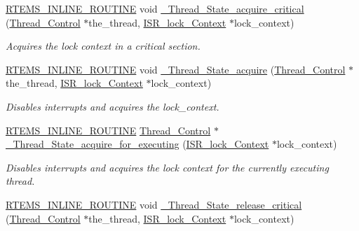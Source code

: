 \begin{DoxyCompactItemize}
\mbox{\hyperlink{group__RTEMSScoreBaseDefs_gac216239df231d5dbd15e3520b0b9313f}{R\+T\+E\+M\+S\+\_\+\+I\+N\+L\+I\+N\+E\+\_\+\+R\+O\+U\+T\+I\+NE}} void \mbox{\hyperlink{group__RTEMSScoreThread_gafd7ff215edf64b4611da7b7c1d4e3050}{\+\_\+\+Thread\+\_\+\+State\+\_\+acquire\+\_\+critical}} (\mbox{\hyperlink{struct__Thread__Control}{Thread\+\_\+\+Control}} $\ast$the\+\_\+thread, \mbox{\hyperlink{structISR__lock__Context}{I\+S\+R\+\_\+lock\+\_\+\+Context}} $\ast$lock\+\_\+context)
\begin{DoxyCompactList}\small\item\em Acquires the lock context in a critical section. \end{DoxyCompactList}\item 
\mbox{\hyperlink{group__RTEMSScoreBaseDefs_gac216239df231d5dbd15e3520b0b9313f}{R\+T\+E\+M\+S\+\_\+\+I\+N\+L\+I\+N\+E\+\_\+\+R\+O\+U\+T\+I\+NE}} void \mbox{\hyperlink{group__RTEMSScoreThread_ga9a583864cdcbb7eaeda8002d05de6912}{\+\_\+\+Thread\+\_\+\+State\+\_\+acquire}} (\mbox{\hyperlink{struct__Thread__Control}{Thread\+\_\+\+Control}} $\ast$the\+\_\+thread, \mbox{\hyperlink{structISR__lock__Context}{I\+S\+R\+\_\+lock\+\_\+\+Context}} $\ast$lock\+\_\+context)
\begin{DoxyCompactList}\small\item\em Disables interrupts and acquires the lock\+\_\+context. \end{DoxyCompactList}\item 
\mbox{\hyperlink{group__RTEMSScoreBaseDefs_gac216239df231d5dbd15e3520b0b9313f}{R\+T\+E\+M\+S\+\_\+\+I\+N\+L\+I\+N\+E\+\_\+\+R\+O\+U\+T\+I\+NE}} \mbox{\hyperlink{struct__Thread__Control}{Thread\+\_\+\+Control}} $\ast$ \mbox{\hyperlink{group__RTEMSScoreThread_ga21404c6b38c1c88748cec78a4bbd25f1}{\+\_\+\+Thread\+\_\+\+State\+\_\+acquire\+\_\+for\+\_\+executing}} (\mbox{\hyperlink{structISR__lock__Context}{I\+S\+R\+\_\+lock\+\_\+\+Context}} $\ast$lock\+\_\+context)
\begin{DoxyCompactList}\small\item\em Disables interrupts and acquires the lock context for the currently executing thread. \end{DoxyCompactList}\item 
\mbox{\hyperlink{group__RTEMSScoreBaseDefs_gac216239df231d5dbd15e3520b0b9313f}{R\+T\+E\+M\+S\+\_\+\+I\+N\+L\+I\+N\+E\+\_\+\+R\+O\+U\+T\+I\+NE}} void \mbox{\hyperlink{group__RTEMSScoreThread_gab003d620d9c5fc5502cedd90960d59d5}{\+\_\+\+Thread\+\_\+\+State\+\_\+release\+\_\+critical}} (\mbox{\hyperlink{struct__Thread__Control}{Thread\+\_\+\+Control}} $\ast$the\+\_\+thread, \mbox{\hyperlink{structISR__lock__Context}{I\+S\+R\+\_\+lock\+\_\+\+Context}} $\ast$lock\+\_\+context)

\end{DoxyCompactItemize}
